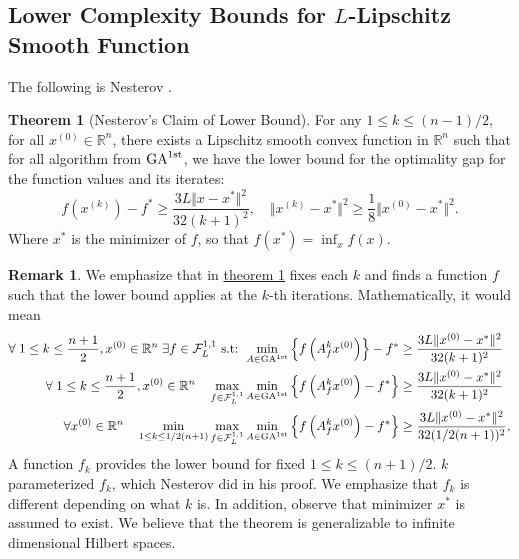 \documentclass[]{article}
\theoremstyle{definition}
\newtheorem{theorem}{Theorem}[subsection]       %
\newtheorem{remark}{Remark}[subsection]
{
    \newtheorem{assumption}{Assumption}
}
\numberwithin{equation}{subsection}
\begin{document}
    \subsection{Lower Complexity Bounds for $L$-Lipschitz Smooth Function}
        The following is Nesterov \cite[Thm 2.1.7]{nesterov_lecture_2018}. 
        \begin{theorem}[Nesterov's Claim of Lower Bound]\label{thm:nesterov_lower_bnd}
            For any $1\le k \le (n - 1)/2$, for all $x^{(0)}\in \mathbb R^n$, there exists a Lipschitz smooth convex function in $\mathbb R^n$ such that for all algorithm from $\text{GA}^{\text{1st}}$, we have the lower bound for the optimality gap for the function values and its iterates: 
            \[
                f\left(x^{(k)}\right) - f^* \ge 
                \frac{3L \Vert x - x^*\Vert^2}{32(k + 1)^2}, 
                \quad \Vert x^{(k)} - x^*\Vert^2 \ge \frac{1}{8} \Vert x^{(0)} - x^*\Vert^2.     
            \]
            Where $x^*$ is the minimizer of $f$, so that $f(x^*) = \inf_{x}f(x)$. 
        \end{theorem}
        \begin{remark}
            We emphasize that in \hyperref[thm:nesterov_lower_bnd]{theorem \ref*{thm:nesterov_lower_bnd}} fixes each $k$ and finds a function $f$ such that the lower bound applies at the $k$-th iterations. 
            Mathematically, it would mean 
            \begin{align*}
                \forall\; 1\le k \le \frac{n + 1}{2}, x^{(0)} \in \mathbb R^n\; 
                \exists f \in \mathcal F^{1, 1}_L \text{ s.t: }
                \min_{A\in \text{GA}^{\text{1st}}} 
                \left\lbrace
                    f\left(A_f^k x^{(0)}\right)
                \right\rbrace - f^* 
                &\ge 
                \frac{3L \Vert x^{(0)} - x^*\Vert^2}{32(k + 1)^2}
                \\
                \forall\; 1\le k \le \frac{n + 1}{2}, x^{(0)} \in \mathbb R^n
                \quad
                \max_{f\in \mathcal F_L^{1,1}}
                \min_{A\in \text{GA}^{\text{1st}}} 
                \left\lbrace
                    f\left(A_f^k x^{(0)}\right) - f^*  
                \right\rbrace 
                &\ge 
                \frac{3L \Vert x^{(0)} - x^*\Vert^2}{32(k + 1)^2}
                \\
                \forall
                x^{(0)} \in \mathbb R^n \quad 
                \min_{1 \le k \le 1/2 (n + 1)}
                \max_{f\in \mathcal F_L^{1, 1}}
                \min_{ A \in \text{GA}^{\text{1st}}}
                \left\lbrace
                    f\left(A_f^kx^{(0)}\right) - f^*
                \right\rbrace
                & \ge 
                \frac{3L \Vert x^{(0)} - x^*\Vert^2}{32(1/2(n + 1))^2}, 
            \end{align*}
            A function $f_k$ provides the lower bound for fixed $1 \le k \le (n+ 1)/2$. 
            $k$ parameterized $f_k$, which Nesterov did in his proof. 
            We emphasize that $f_k$ is different depending on what $k$ is. 
            In addition, observe that minimizer $x^*$ is assumed to exist. 
            We believe that the theorem is generalizable to infinite dimensional Hilbert spaces. 
        \end{remark}
\end{document}
